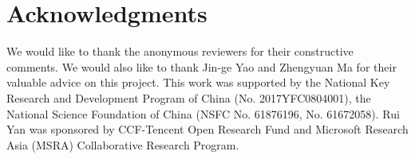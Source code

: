 \documentclass[11pt,a4paper]{article}
\begin{document}
\section*{Acknowledgments}

We would like to thank the anonymous reviewers for their constructive comments. We would also like to thank Jin-ge Yao and Zhengyuan Ma for their valuable advice on this project. This work was supported by the National Key Research and Development Program of China (No. 2017YFC0804001), the National Science Foundation of China (NSFC No. 61876196, No. 61672058). Rui Yan was sponsored by CCF-Tencent Open Research Fund and Microsoft Research Asia (MSRA) Collaborative Research Program.
























\end{document}
